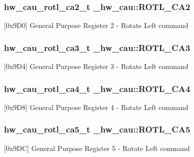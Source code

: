 \subsubsection[{\texorpdfstring{R\+O\+T\+L\+\_\+\+C\+A2}{ROTL_CA2}}]{ {\bf hw\+\_\+cau\+\_\+rotl\+\_\+ca2\+\_\+t} \+\_\+hw\+\_\+cau\+::\+R\+O\+T\+L\+\_\+\+C\+A2}\hypertarget{struct__hw__cau_a66339c6d0e1f64ebe5e4814e02dd46fe}{}\label{struct__hw__cau_a66339c6d0e1f64ebe5e4814e02dd46fe}
\mbox{[}0x9\+D0\mbox{]} General Purpose Register 2 -\/ Rotate Left command 
\subsubsection[{\texorpdfstring{R\+O\+T\+L\+\_\+\+C\+A3}{ROTL_CA3}}]{ {\bf hw\+\_\+cau\+\_\+rotl\+\_\+ca3\+\_\+t} \+\_\+hw\+\_\+cau\+::\+R\+O\+T\+L\+\_\+\+C\+A3}\hypertarget{struct__hw__cau_aec68be7f2ff4597aa6f51cd73c6c77b1}{}\label{struct__hw__cau_aec68be7f2ff4597aa6f51cd73c6c77b1}
\mbox{[}0x9\+D4\mbox{]} General Purpose Register 3 -\/ Rotate Left command 
\subsubsection[{\texorpdfstring{R\+O\+T\+L\+\_\+\+C\+A4}{ROTL_CA4}}]{ {\bf hw\+\_\+cau\+\_\+rotl\+\_\+ca4\+\_\+t} \+\_\+hw\+\_\+cau\+::\+R\+O\+T\+L\+\_\+\+C\+A4}\hypertarget{struct__hw__cau_a4056ad72ebb592ff6d572fee7294644b}{}\label{struct__hw__cau_a4056ad72ebb592ff6d572fee7294644b}
\mbox{[}0x9\+D8\mbox{]} General Purpose Register 4 -\/ Rotate Left command 
\subsubsection[{\texorpdfstring{R\+O\+T\+L\+\_\+\+C\+A5}{ROTL_CA5}}]{ {\bf hw\+\_\+cau\+\_\+rotl\+\_\+ca5\+\_\+t} \+\_\+hw\+\_\+cau\+::\+R\+O\+T\+L\+\_\+\+C\+A5}\hypertarget{struct__hw__cau_a23e39aa871ba535db0edc7e6aaa6dc27}{}\label{struct__hw__cau_a23e39aa871ba535db0edc7e6aaa6dc27}
\mbox{[}0x9\+DC\mbox{]} General Purpose Register 5 -\/ Rotate Left command 

